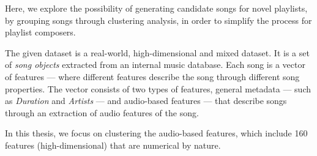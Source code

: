 \documentclass[../report.tex]{subfiles}
\begin{document}
Here, we explore the possibility of generating candidate songs for novel playlists, by grouping songs through clustering analysis, in order to simplify the process for playlist composers.

The given dataset is a real-world, high-dimensional and mixed dataset. It is a set of \textit{song objects} extracted from an internal music database. Each song is a vector of features --- where different features describe the song through different song properties. The vector consists of two types of features, general metadata --- such as \textit{Duration} and \textit{Artists} --- and audio-based features --- that describe songs through an extraction of audio features of the song.

In this thesis, we focus on clustering the audio-based features, which include 160 features (high-dimensional) that are numerical by nature.




\end{document}
